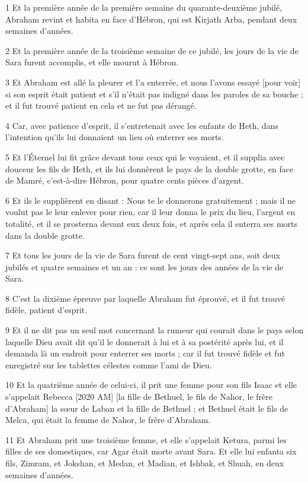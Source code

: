 \par 1 Et la première année de la première semaine du quarante-deuxième jubilé, Abraham revint et habita en face d'Hébron, qui est Kirjath Arba, pendant deux semaines d'années.
\par 2 Et la première année de la troisième semaine de ce jubilé, les jours de la vie de Sara furent accomplis, et elle mourut à Hébron.
\par 3 Et Abraham est allé la pleurer et l'a enterrée, et nous l'avons essayé [pour voir] si son esprit était patient et s'il n'était pas indigné dans les paroles de sa bouche ; et il fut trouvé patient en cela et ne fut pas dérangé.
\par 4 Car, avec patience d'esprit, il s'entretenait avec les enfants de Heth, dans l'intention qu'ils lui donnaient un lieu où enterrer ses morts.
\par 5 Et l'Éternel lui fit grâce devant tous ceux qui le voyaient, et il supplia avec douceur les fils de Heth, et ils lui donnèrent le pays de la double grotte, en face de Mamré, c'est-à-dire Hébron, pour quatre cents pièces d'argent.
\par 6 Et ils le supplièrent en disant : Nous te le donnerons gratuitement ; mais il ne voulut pas le leur enlever pour rien, car il leur donna le prix du lieu, l'argent en totalité, et il se prosterna devant eux deux fois, et après cela il enterra ses morts dans la double grotte.
\par 7 Et tous les jours de la vie de Sara furent de cent vingt-sept ans, soit deux jubilés et quatre semaines et un an : ce sont les jours des années de la vie de Sara.
\par 8 C'est la dixième épreuve par laquelle Abraham fut éprouvé, et il fut trouvé fidèle, patient d'esprit.
\par 9 Et il ne dit pas un seul mot concernant la rumeur qui courait dans le pays selon laquelle Dieu avait dit qu'il le donnerait à lui et à sa postérité après lui, et il demanda là un endroit pour enterrer ses morts ; car il fut trouvé fidèle et fut enregistré sur les tablettes célestes comme l'ami de Dieu.
\par 10 Et la quatrième année de celui-ci, il prit une femme pour son fils Isaac et elle s'appelait Rebecca [2020 AM] [la fille de Bethuel, le fils de Nahor, le frère d'Abraham] la sœur de Laban et la fille de Bethuel ; et Bethuel était le fils de Melca, qui était la femme de Nahor, le frère d'Abraham.
\par 11 Et Abraham prit une troisième femme, et elle s'appelait Ketura, parmi les filles de ses domestiques, car Agar était morte avant Sara. Et elle lui enfanta six fils, Zimram, et Jokshan, et Medan, et Madian, et Ishbak, et Shuah, en deux semaines d'années.

